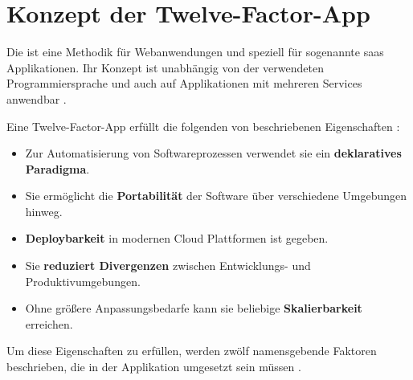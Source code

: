 \section{Konzept der Twelve-Factor-App}
\label{sec:03-05_concept-of-twelve-factor-app}

Die  ist eine Methodik für Webanwendungen und speziell für sogenannte \Gls{saas} Applikationen. Ihr Konzept ist unabhängig von der verwendeten Programmiersprache und auch auf Applikationen mit mehreren Services anwendbar \cite{101:The-Twelve-Factor-App}.

Eine Twelve-Factor-App erfüllt die folgenden von \citeauthor{103:Creating-Cloud-native-applications-12-Factor-Applications} beschriebenen Eigenschaften \cite{103:Creating-Cloud-native-applications-12-Factor-Applications}:

\begin{itemize}
    \item Zur Automatisierung von Softwareprozessen verwendet sie ein \textbf{deklaratives Paradigma}.
    \item Sie ermöglicht die \textbf{Portabilität} der Software über verschiedene Umgebungen hinweg.
    \item \textbf{Deploybarkeit} in modernen Cloud Plattformen ist gegeben.
    \item Sie \textbf{reduziert Divergenzen} zwischen Entwicklungs- und Produktivumgebungen.
    \item Ohne größere Anpassungsbedarfe kann sie beliebige \textbf{Skalierbarkeit} erreichen.
\end{itemize}

Um diese Eigenschaften zu erfüllen, werden zwölf namensgebende Faktoren beschrieben, die in der Applikation umgesetzt sein müssen \cite{101:The-Twelve-Factor-App,102:Twelve-Factor-App-Revisited}.

